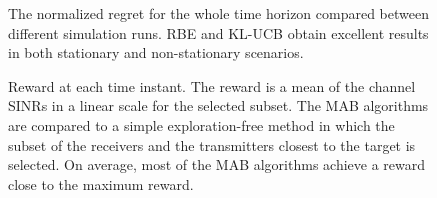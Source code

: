 \documentclass[english, 12pt, a4paper, elec, utf8, a-1b, online]{aaltothesis}
\begin{document}
\begin{figure}[!tb]\centering
    \hfill
    \caption{The normalized regret for the whole time horizon compared between different simulation runs.
            RBE and KL-UCB obtain excellent results in both stationary and non-stationary scenarios.}
    \label{fig:ci}
\end{figure}

\begin{figure}[!tb]
    \hfill
    \caption{Reward at each time instant.
    The reward is a mean of the channel SINRs in a linear scale for the selected subset.
    The MAB algorithms are compared to a simple exploration-free method in which the subset of the receivers and the transmitters closest to the target is selected.
    On average, most of the MAB algorithms achieve a reward close to the maximum reward.}
    \label{fig:sinr}
\end{figure}
\end{document}
